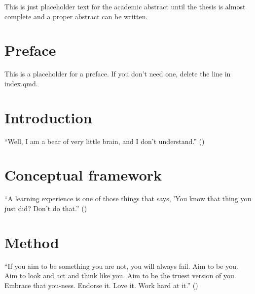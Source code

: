 \documentclass[
  12pt,
  a4paper,
]{scrbook}
\begin{document}

This is just placeholder text for the academic abstract until the thesis
is almost complete and a proper abstract can be written.


\chapter*{Preface}\label{preface}


This is a placeholder for a preface. If you don't need one, delete the
line in index.qmd.

\tableofcontents
\listoftables
\listoffigures

\let\mainmatter\mainmatterreal
\mainmatterreal


\chapter{Introduction}\label{introduction}

``Well, I am a bear of very little brain, and I don't understand.''
()

\lipsum[1-20]


\chapter{Conceptual framework}\label{conceptual-framework}

``A learning experience is one of those things that says, 'You know that
thing you just did? Don't do that.'' ()

\lipsum[21-40]


\chapter{Method}\label{method}

``If you aim to be something you are not, you will always fail. Aim to
be you. Aim to look and act and think like you. Aim to be the truest
version of you. Embrace that you-ness. Endorse it. Love it. Work hard at
it.'' ()
\end{document}
